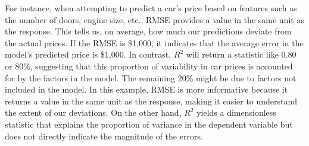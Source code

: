 \documentclass[12pt]{article}
\begin{document}
\begin{enumerate}
For instance, when attempting to predict a car's price based on features such as the number of doors, engine size, etc., RMSE provides a value in the same unit as the response. This tells us, on average, how much our predictions deviate from the actual prices. If the RMSE is \$1,000, it indicates that the average error in the model's predicted price is \$1,000. In contrast, $R^{2}$ will return a statistic like 0.80 or 80\%, suggesting that this proportion of variability in car prices is accounted for by the factors in the model. The remaining 20\% might be due to factors not included in the model. In this example, RMSE is more informative because it returns a value in the same unit as the response, making it easier to understand the extent of our deviations. On the other hand, $R^{2}$ yields a dimensionless statistic that explains the proportion of variance in the dependent variable but does not directly indicate the magnitude of the errors. \\ \\ \\ \\ \\ \\ \\ \\ \\ \\ \\ \\ \\ \\ \\ \\ \\ \\ \\ \\ \\ \\ \\ \\ \\ \\ \\ \\ \\



\end{enumerate}
\end{document}
